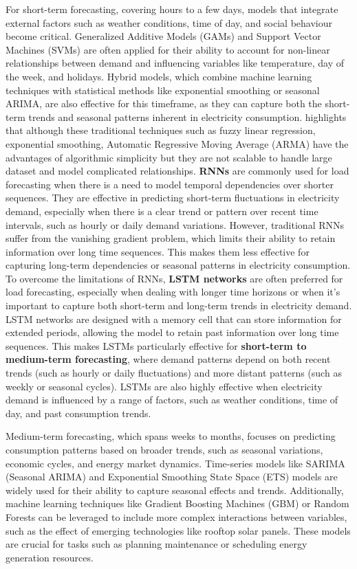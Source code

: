 \documentclass[mstat,12pt]{unswthesis}
\begin{document}
For short-term forecasting, covering hours to a few days, models that
integrate external factors such as weather conditions, time of day, and
social behaviour become critical. Generalized Additive Models (GAMs) and
Support Vector Machines (SVMs) are often applied for their ability to
account for non-linear relationships between demand and influencing
variables like temperature, day of the week, and holidays. Hybrid
models, which combine machine learning techniques with statistical
methods like exponential smoothing or seasonal ARIMA, are also effective
for this timeframe, as they can capture both the short-term trends and
seasonal patterns inherent in electricity consumption. \cite{Wang2021}
highlights that although these traditional techniques such as fuzzy
linear regression, exponential smoothing, Automatic Regressive Moving
Average (ARMA) have the advantages of algorithmic simplicity but they
are not scalable to handle large dataset and model complicated
relationships. \textbf{RNNs} are commonly used for load forecasting when
there is a need to model temporal dependencies over shorter sequences.
They are effective in predicting short-term fluctuations in electricity
demand, especially when there is a clear trend or pattern over recent
time intervals, such as hourly or daily demand variations. However,
traditional RNNs suffer from the vanishing gradient problem, which
limits their ability to retain information over long time sequences.
This makes them less effective for capturing long-term dependencies or
seasonal patterns in electricity consumption. To overcome the
limitations of RNNs, \textbf{LSTM networks} are often preferred for load
forecasting, especially when dealing with longer time horizons or when
it's important to capture both short-term and long-term trends in
electricity demand. LSTM networks are designed with a memory cell that
can store information for extended periods, allowing the model to retain
past information over long time sequences. This makes LSTMs particularly
effective for \textbf{short-term to medium-term forecasting}, where
demand patterns depend on both recent trends (such as hourly or daily
fluctuations) and more distant patterns (such as weekly or seasonal
cycles). LSTMs are also highly effective when electricity demand is
influenced by a range of factors, such as weather conditions, time of
day, and past consumption trends.

Medium-term forecasting, which spans weeks to months, focuses on
predicting consumption patterns based on broader trends, such as
seasonal variations, economic cycles, and energy market dynamics.
Time-series models like SARIMA (Seasonal ARIMA) and Exponential
Smoothing State Space (ETS) models are widely used for their ability to
capture seasonal effects and trends. Additionally, machine learning
techniques like Gradient Boosting Machines (GBM) or Random Forests can
be leveraged to include more complex interactions between variables,
such as the effect of emerging technologies like rooftop solar panels.
These models are crucial for tasks such as planning maintenance or
scheduling energy generation resources.
\end{document}

